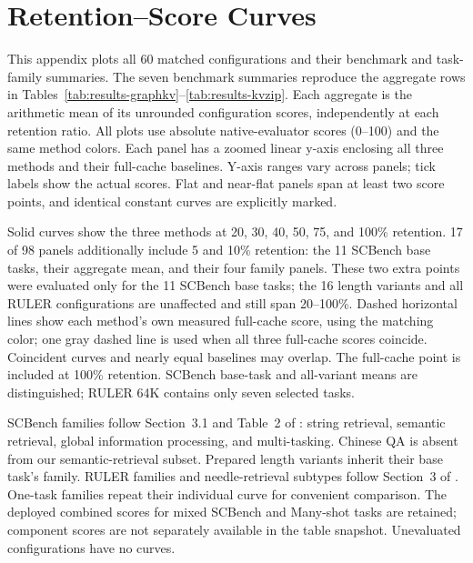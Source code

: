 \section{Retention--Score Curves}
\label{app:retention-curves}

This appendix plots all 60 matched configurations and their benchmark and task-family summaries. The seven benchmark summaries reproduce the aggregate rows in Tables~\ref{tab:results-graphkv}--\ref{tab:results-kvzip}. Each aggregate is the arithmetic mean of its unrounded configuration scores, independently at each retention ratio. All plots use absolute native-evaluator scores (0--100) and the same method colors. Each panel has a zoomed linear y-axis enclosing all three methods and their full-cache baselines. Y-axis ranges vary across panels; tick labels show the actual scores. Flat and near-flat panels span at least two score points, and identical constant curves are explicitly marked.

Solid curves show the three methods at 20, 30, 40, 50, 75, and 100\% retention. 17 of 98 panels additionally include 5 and 10\% retention: the 11 SCBench base tasks, their aggregate mean, and their four family panels. These two extra points were evaluated only for the 11 SCBench base tasks; the 16 length variants and all RULER configurations are unaffected and still span 20--100\%. Dashed horizontal lines show each method's own measured full-cache score, using the matching color; one gray dashed line is used when all three full-cache scores coincide. Coincident curves and nearly equal baselines may overlap. The full-cache point is included at 100\% retention. SCBench base-task and all-variant means are distinguished; RULER 64K contains only seven selected tasks.

SCBench families follow Section~3.1 and Table~2 of \citet{li2025scbench}: string retrieval, semantic retrieval, global information processing, and multi-tasking. Chinese QA is absent from our semantic-retrieval subset. Prepared length variants inherit their base task's family. RULER families and needle-retrieval subtypes follow Section~3 of \citet{hsieh2024ruler}. One-task families repeat their individual curve for convenient comparison. The deployed combined scores for mixed SCBench and Many-shot tasks are retained; component scores are not separately available in the table snapshot. Unevaluated configurations have no curves.

